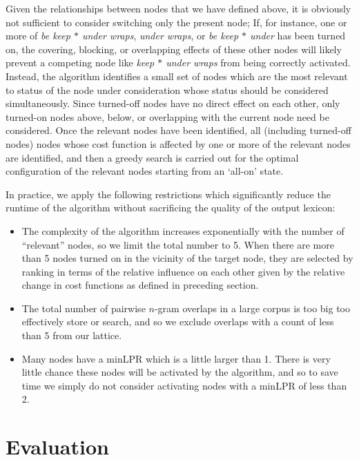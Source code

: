 \documentclass[11pt]{article}
\newcommand{\gap}{$*$\xspace}
\newcommand{\ex}[1]{\textit{#1}\xspace}
\begin{document}

Given the relationships between nodes that we have defined above, it is obviously not sufficient to consider switching only the present node; If, for instance, one or more of \ex{be keep \gap under wraps}, \ex{under wraps}, or \ex{be keep \gap under} has been turned on, the covering, blocking, or overlapping effects of these other nodes will likely prevent a competing node like \ex{keep \gap under wraps} from being correctly activated. Instead, the algorithm identifies a small set of nodes which are the most relevant to status of the node under consideration whose status should be considered simultaneously. Since turned-off nodes have no direct effect on each other, only turned-on nodes above, below, or overlapping with the current node need be considered.  Once the relevant nodes have been identified, all (including turned-off nodes) nodes whose cost function is affected by one or more of the relevant nodes are identified, and then a greedy search is carried out for the optimal configuration of the relevant nodes starting from an `all-on' state. 

In practice, we apply the following restrictions which significantly reduce the runtime of the algorithm without sacrificing the quality of the output lexicon:

\begin{itemize}
\item The complexity of the algorithm increases exponentially with the number of ``relevant'' nodes, so we limit the total number to 5. When there are more than 5 nodes turned on in the vicinity of the target node, they are selected by ranking in terms of the relative influence on each other given by the relative change in cost functions as defined in preceding section.
\item The total number of pairwise $n$-gram overlaps in a large corpus is too big too effectively store or search, and so we exclude overlaps with a count of less than 5 from our lattice.
\item Many nodes have a minLPR which is a little larger than 1. There is very little chance these nodes will be activated by the algorithm, and so to save time we simply do not consider activating nodes with a minLPR of less than 2.
\end{itemize}

\section{Evaluation}
\end{document}
